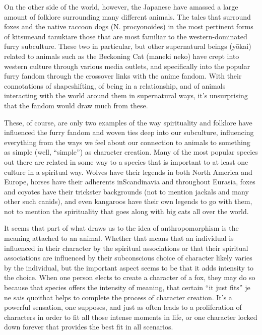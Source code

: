 On the other side of the world, however, the Japanese have amassed a large amount of folklore surrounding many different animals. The tales that surround foxes and the native raccoon dogs (N. procyonoides) in the most pertinent forms of kitsuneand tanukiare those that are most familiar to the western-dominated furry subculture. These two in particular, but other supernatural beings (yōkai) related to animals such as the Beckoning Cat (maneki neko) have crept into western culture through various media outlets, and specifically into the popular furry fandom through the crossover links with the anime fandom. With their connotations of shapeshifting, of being in a relationship, and of animals interacting with the world around them in supernatural ways, it's unsurprising that the fandom would draw much from these.

These, of course, are only two examples of the way spirituality and folklore have influenced the furry fandom and woven ties deep into our subculture, influencing everything from the ways we feel about our connection to animals to something as simple (well, ``simple'') as character creation. Many of the most popular species out there are related in some way to a species that is important to at least one culture in a spiritual way. Wolves have their legends in both North America and Europe, horses have their adherents inScandinavia and throughout Eurasia, foxes and coyotes have their trickster backgrounds (not to mention jackals and many other such canids), and even kangaroos have their own legends to go with them, not to mention the spirituality that goes along with big cats all over the world.

It seems that part of what draws us to the idea of anthropomorphism is the meaning attached to an animal. Whether that means that an individual is influenced in their character by the spiritual associations or that their spiritual associations are influenced by their subconscious choice of character likely varies by the individual, but the important aspect seems to be that it adds intensity to the choice. When one person elects to create a character of a fox, they may do so because that species offers the intensity of meaning, that certain ``it just fits'' je ne sais quoithat helps to complete the process of character creation. It's a powerful sensation, one supposes, and just as often leads to a proliferation of characters in order to fit all those intense moments in life, or one character locked down forever that provides the best fit in all scenarios.

